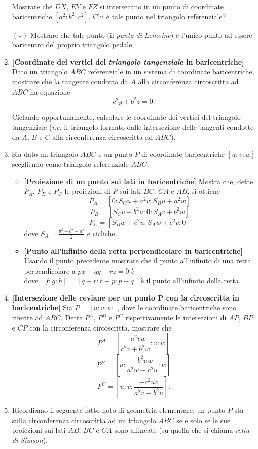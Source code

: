 \begin{enumerate}
	Mostrare che $DX$, $EY$ e $FZ$ si intersecano in un punto di coordinate baricentriche $[a^2:b^2:c^2]$. Chi è tale punto nel triangolo referenziale?
	
	$(\star)$ Mostrare che tale punto (il \textit{punto di Lemoine}) è l'unico punto ad essere baricentro del proprio triangolo pedale.
	\item \textbf{[Coordinate dei vertici del \textit{triangolo tangenziale} in baricentriche]}  Dato un triangolo $ABC$ referenziale in un sistema di coordinate baricentriche, mostrare che la tangente condotta da $A$ alla circonferenza circoscritta ad $ABC$ ha equazione
	\begin{equation}
	c^2y+b^2z=0.
	\end{equation}
	
	Ciclando opportunamente, calcolare le coordinate dei vertici del triangolo tangenziale (\textit{i.e.} il triangolo formato dalle intersezione delle tangenti condotte da $A$, $B$ e $C$ alla circonferenza circoscritta ad $ABC$).
	\item Sia dato un triangolo $ABC$ e un punto $P$ di coordinate baricentriche $[u:v:w]$ scegliendo come triangolo referenziale $ABC$.
		\begin{itemize}
			\item \textbf{[Proiezione di un punto sui lati in baricentriche]} Mostra che, dette $P_A$, $P_B$ e $P_C$ le proiezioni di $P$ sui lati $BC$, $CA$ e $AB$, si ottiene
			$$
			P_A = [0: S_Cu+a^2v:S_Bu+a^2w]
			$$
			$$
			P_B = [S_Cv+b^2u: 0: S_Av+b^2w]
			$$
			$$
			P_C = [S_Bw+c^2u: S_Aw+c^2v: 0]
			$$			
			dove $S_A=\displaystyle\frac{b^2+c^2-a^2}{2}$ e cicliche.
			\item  \textbf{[Punto all'infinito della retta perpendicolare in baricentriche]} Usando il punto precedente mostrare che 
			il punto all'infinito di una retta perpendicolare a $px+qy+rz=0$ è
			\begin{equation}
			[S_Bg-S_Ch:S_Ch-S_Af:S_Af-S_Bg]
			\end{equation}
			dove $[f:g:h]=[q-r:r-p:p-q]$ è il punto all'infinito della retta.
		\end{itemize}
	\item \textbf{[Intersezione delle ceviane per un punto P con la circoscritta in baricentriche]} Sia $P=[u:v:w]$, dove le coordinate baricentriche 
	sono riferite ad $ABC$. Dette $P^A$, $P^B$ e $P^C$ rispettivamente le intersezioni di $AP$, $BP$ e $CP$ con la circonferenza circoscritta, mostrare che 
	$$
	P^A=\left[\displaystyle\frac{-a^2vw}{c^2v+b^2w}:v:w\right]
	$$
	$$
	P^B=\left[u:\displaystyle\frac{-b^2uw}{a^2w+c^2u}:w\right]
	$$
	$$
	P^C=\left[u:v:\displaystyle\frac{-c^2uv}{a^2v+b^2u}\right].
	$$
	\item Ricordiamo il seguente fatto noto di geometria elementare: un punto $P$ sta sulla circonferenza circoscritta ad un triangolo $ABC$ se e solo se le sue proiezioni sui lati $AB$, $BC$ e $CA$ sono allineate (su quella che si chiama \textit{retta di Simson}). 
	

\end{enumerate}
